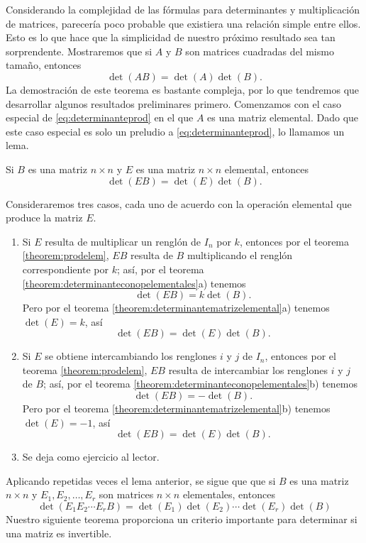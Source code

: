 Considerando la complejidad de las fórmulas para determinantes y multiplicación de matrices, parecería poco probable que existiera una relación simple entre ellos. Esto es lo que hace que la simplicidad de nuestro próximo resultado sea tan sorprendente. Mostraremos que si $A$ y $B$ son matrices cuadradas del mismo tamaño, entonces
\begin{equation}
    \det(AB) = \det(A) \det(B). \label{eq:determinanteprod}
\end{equation}
La demostración de este teorema es bastante compleja, por lo que tendremos que desarrollar algunos resultados preliminares primero. Comenzamos con el caso especial de \eqref{eq:determinanteprod} en el que $A$ es una matriz elemental. Dado que este caso especial es solo un preludio a \eqref{eq:determinanteprod}, lo llamamos un lema.

\begin{lemma}{}{}
    Si $B$ es una matriz $n \times n$ y $E$ es una matriz $n \times n$ elemental, entonces
    $$\det(EB) = \det(E) \det(B).$$

    \tcblower
    \demostracion Consideraremos tres casos, cada uno de acuerdo con la operación elemental que produce la matriz $E$.
    \begin{enumerate}[label=\roman*), topsep=6pt, itemsep=0pt]
        \item Si $E$ resulta de multiplicar un renglón de $I_n$ por $k$, entonces por el teorema \ref{theorem:prodelem}, $EB$ resulta de $B$ multiplicando el renglón correspondiente por $k$; así, por el teorema \ref{theorem:determinanteconopelementales}a) tenemos
        $$\det(EB) = k \det(B).$$
        \newpage
        Pero por el teorema \ref{theorem:determinantematrizelemental}a) tenemos $\det(E) = k$, así
        $$\det(EB) = \det(E) \det(B).$$
        \item Si $E$ se obtiene intercambiando los renglones $i$ y $j$ de $I_n$, entonces por el teorema \ref{theorem:prodelem}, $EB$ resulta de intercambiar los renglones $i$ y $j$ de $B$; así, por el teorema \ref{theorem:determinanteconopelementales}b) tenemos
        $$\det(EB) = -\det(B).$$
        Pero por el teorema \ref{theorem:determinantematrizelemental}b) tenemos $\det(E) = -1$, así
        $$\det(EB) = \det(E) \det(B).$$
        \item Se deja como ejercicio al lector.
    \end{enumerate}
\end{lemma}

Aplicando repetidas veces el lema anterior, se sigue que que si $B$ es una matriz $n \times n$ y $E_1, E_2, \dots, E_r$ son matrices $n \times n$ elementales, entonces
\begin{equation}
    \det(E_1 E_2 \cdots E_r B) = \det(E_1) \det(E_2) \cdots \det(E_r) \det(B) \label{determinantelemaprodfin}
\end{equation}
Nuestro siguiente teorema proporciona un criterio importante para determinar si una matriz es invertible.

